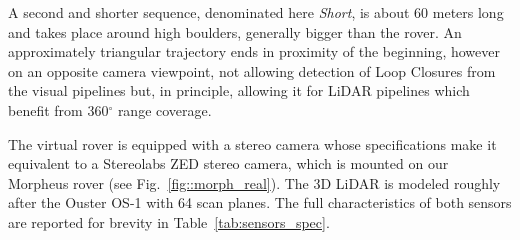 \documentclass[conference]{IEEEtran}  %
\begin{document}
A second and shorter sequence, denominated here \textit{Short}, is about 60 meters long and takes place around high boulders, generally bigger than the rover. An approximately triangular trajectory ends in proximity of the beginning, however on an opposite camera viewpoint, not allowing detection of Loop Closures from the visual pipelines but, in principle, allowing it for LiDAR pipelines which benefit from 360$^\circ$ range coverage.

The virtual rover is equipped with a stereo camera whose specifications make it equivalent to a Stereolabs ZED stereo camera, which is mounted on our Morpheus rover (see Fig.~{\ref{fig::morph_real}}). The 3D LiDAR is modeled roughly after the Ouster OS-1 with 64 scan planes. The full characteristics of both sensors are reported for brevity in Table~\ref{tab:sensors_spec}.
\end{document}
